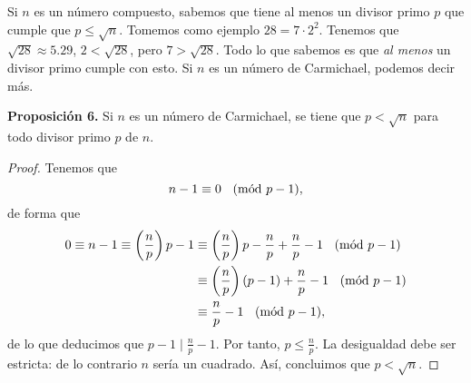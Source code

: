 \documentclass{article}
\theoremstyle{definition}
\newcommand{\Mod}[1]{\ \hspace{0.2cm} (\mathrm{m\acute{o}d}\ #1)}
\begin{document}
Si $n$ es un número compuesto, sabemos que tiene al menos un divisor primo $p$ que cumple que $ p \leq \sqrt{n}$.  Tomemos como ejemplo $28 = 7 \cdot 2^2$. Tenemos que $\sqrt{28} \approx 5.29$, $2 < \sqrt{28}$, pero $7 > \sqrt{28}$. Todo lo que sabemos es que \textit{al menos} un divisor primo cumple con esto. Si $n$ es un número de Carmichael, podemos decir más. 
\vspace{0.3cm} 
\begin{mybox2}
	\textbf{Proposición 6. } Si $n$ es un número de Carmichael, se tiene que $p < \sqrt{n}$ para todo divisor primo $p$ de $n$. 
\end{mybox2}	
\begin{proof}
	Tenemos que  
	$$ n - 1 \equiv 0 \Mod{p -1}, $$
	de forma que 
\begin{equation*}
\begin{split}
0\equiv n - 1 \equiv \left( \frac{n}{p} \right)p - 1& \equiv \left( \frac{n}{p}\right)p - \frac{n}{p} + \frac{n}{p}  - 1 \Mod{p - 1} \\
& \equiv \left( \frac{n}{p} \right) (p - 1) + \frac{n}{p} - 1 \Mod{p - 1} \\
&\equiv \frac{n}{p} - 1 \Mod{p - 1},   
\end{split}
\end{equation*}	
de lo que deducimos que $p - 1 \mid \frac{n}{p} - 1$. Por tanto, $ p \leq \frac{n}{p}$. La desigualdad debe ser estricta: de lo contrario $n$ sería un cuadrado. Así, concluimos que $p < \sqrt{n}$.
\end{proof}
\end{document}
